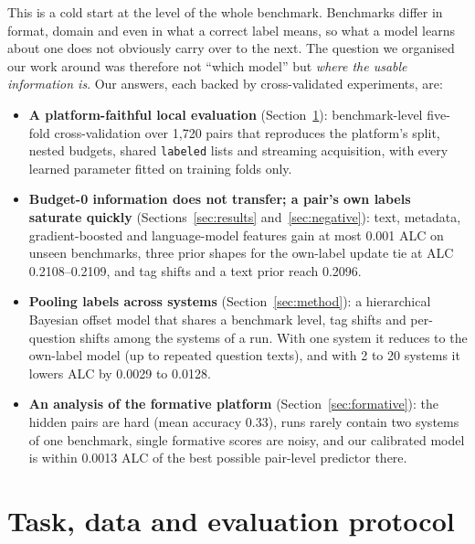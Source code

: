 \documentclass{article}
\newcommand{\code}[1]{\texttt{#1}}
\newcommand{\labeled}{\code{labeled}}
\begin{document}
This is a cold start at the level of the whole benchmark. Benchmarks differ in format, domain and even in what a correct label means, so what a model learns about one does not obviously carry over to the next. The question we organised our work around was therefore not ``which model'' but \emph{where the usable information is}. Our answers, each backed by cross-validated experiments, are:
\begin{itemize}
  \item \textbf{A platform-faithful local evaluation} (Section~\ref{sec:protocol}): benchmark-level five-fold cross-validation over 1{,}720 pairs that reproduces the platform's split, nested budgets, shared \labeled{} lists and streaming acquisition, with every learned parameter fitted on training folds only.
  \item \textbf{Budget-0 information does not transfer; a pair's own labels saturate quickly} (Sections~\ref{sec:results} and~\ref{sec:negative}): text, metadata, gradient-boosted and language-model features gain at most 0.001 ALC on unseen benchmarks, three prior shapes for the own-label update tie at ALC 0.2108--0.2109, and tag shifts and a text prior reach 0.2096.
  \item \textbf{Pooling labels across systems} (Section~\ref{sec:method}): a hierarchical Bayesian offset model that shares a benchmark level, tag shifts and per-question shifts among the systems of a run. With one system it reduces to the own-label model (up to repeated question texts), and with 2 to 20 systems it lowers ALC by 0.0029 to 0.0128.
  \item \textbf{An analysis of the formative platform} (Section~\ref{sec:formative}): the hidden pairs are hard (mean accuracy 0.33), runs rarely contain two systems of one benchmark, single formative scores are noisy, and our calibrated model is within 0.0013 ALC of the best possible pair-level predictor there.
\end{itemize}

\section{Task, data and evaluation protocol}
\label{sec:protocol}
\end{document}
